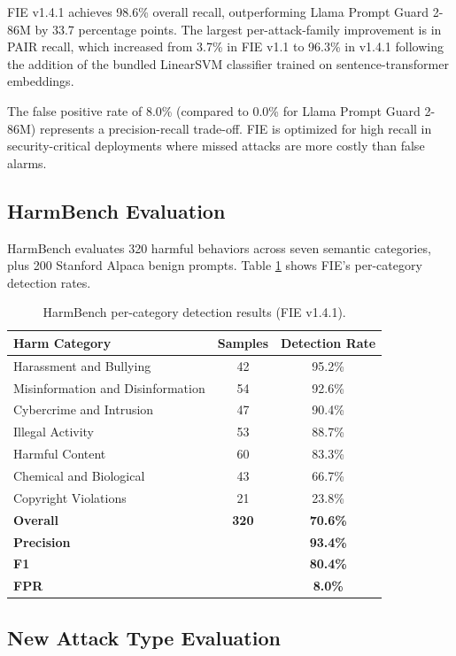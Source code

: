\documentclass[preprint,12pt,authoryear]{elsarticle}
\begin{document}
FIE v1.4.1 achieves 98.6\% overall recall, outperforming Llama Prompt
Guard 2-86M by 33.7 percentage points. The largest per-attack-family
improvement is in PAIR recall, which increased from 3.7\% in FIE v1.1
to 96.3\% in v1.4.1 following the addition of the bundled LinearSVM
classifier trained on sentence-transformer embeddings.

The false positive rate of 8.0\% (compared to 0.0\% for Llama Prompt
Guard 2-86M) represents a precision-recall trade-off. FIE is optimized
for high recall in security-critical deployments where missed attacks
are more costly than false alarms.

\subsection{HarmBench Evaluation}

HarmBench \citep{mazeika2024harmbench} evaluates 320 harmful behaviors
across seven semantic categories, plus 200 Stanford Alpaca benign
prompts. Table \ref{tab:harmbench} shows FIE's per-category detection
rates.

\begin{table}[H]
\centering
\caption{HarmBench per-category detection results (FIE v1.4.1).}
\label{tab:harmbench}
\begin{tabular}{lcc}
\toprule
\textbf{Harm Category} & \textbf{Samples} & \textbf{Detection Rate} \\
\midrule
Harassment and Bullying & 42 & 95.2\% \\
Misinformation and Disinformation & 54 & 92.6\% \\
Cybercrime and Intrusion & 47 & 90.4\% \\
Illegal Activity & 53 & 88.7\% \\
Harmful Content & 60 & 83.3\% \\
Chemical and Biological & 43 & 66.7\% \\
Copyright Violations & 21 & 23.8\% \\
\midrule
\textbf{Overall} & \textbf{320} & \textbf{70.6\%} \\
\textbf{Precision} & & \textbf{93.4\%} \\
\textbf{F1} & & \textbf{80.4\%} \\
\textbf{FPR} & & \textbf{8.0\%} \\
\bottomrule
\end{tabular}
\end{table}

\subsection{New Attack Type Evaluation}
\end{document}
